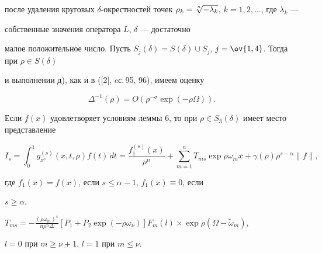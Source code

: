 после удаления круговых $\delta$-окрестностей точек $\rho_k=


\sqrt[\uproot{2}n]{-\lambda_k}$, $k=1,2,\dotsc$, где $\lambda_k$ ---


собственные значения оператора $L$, $ \delta$ --- достаточно


малое положительное число. Пусть $S_j(\delta)=S(\delta)


\cup S_j$, $j=\ov{1,4}$. Тогда при $\rho\in S(\delta)$


и выполнении д), как и в ([2], cс.\,95, 96), имеем оценку


\begin{equation}


\Delta^{-1}(\rho)=O(\rho^{-\sigma}\exp(-\rho\Omega)).


\end{equation}





\begin{lem}


Если $f(x)$ удовлетворяет условиям леммы $6$, то при $\rho\in S_3


(\delta)$ имеет место представление


$$


I_s=\int_0^1g_{x^s}^{(s)}(x,t,\rho)f(t)\,dt= \frac {f_1^{(s)}


(x)}{\rho^n}+\sum\limits_{m=1}^nT_{ms}\exp\rho\omega_mx+\gamma


(\rho)\rho^{s-\alpha}\|f\|,


$$


где $f_1(x)=f(x)$, если $s\le\alpha-1$, $f_1(x)\equiv0$, если


$s\ge\alpha$,


$T_{ms}=- \frac {(\rho\omega_m)^s}{n\rho^n\Delta}[P_1+


P_2\exp(-\rho\omega_\nu)]F_m(l)\times\exp\rho(\Omega-\widetilde\omega_m)$,


$l=0$ при $m\ge\nu+1$, $l=1$ при $m\le\nu$.


\end{lem}





